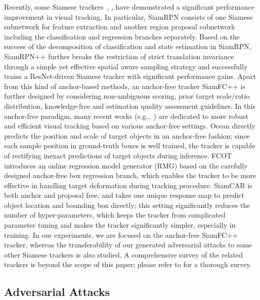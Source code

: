 \documentclass[journal]{IEEEtran}
\newcommand{\eg}{e.g.}
\renewcommand{\uline}{}
\begin{document}
Recently, some Siamese trackers~\cite{SiamFC++}, \cite{zhang2020ocean, cui2020fully, 9157720}, \cite{SiamRPN,SiamRPN++} have demonstrated a significant performance improvement in visual tracking. In particular, SiamRPN \cite{SiamRPN} consists of one Siamese subnetwork for feature extraction and another region proposal subnetwork including the classification and regression branches separately. \uline{Based on the success of the decomposition of classification and state estimation in SiamRPN,} SiamRPN++ \cite{SiamRPN++} further breaks the restriction of strict translation invariance through a simple yet effective spatial aware sampling strategy and successfully trains a ResNet-driven Siamese tracker with significant performance gains. Apart from this kind of anchor-based methods, an anchor-free tracker SiamFC++ \cite{SiamFC++} is further designed by considering non-ambiguous scoring, prior target scale/ratio distribution, knowledge-free and estimation quality assessment guidelines. In this anchor-free paradigm, many recent works (\eg,~\cite{zhang2020ocean, cui2020fully, 9157720}) are dedicated to more robust and efficient visual tracking based on various anchor-free settings. Ocean \cite{zhang2020ocean} directly predicts the position and scale of target objects in an anchor-free fashion; since each sample position in \uline{ground-truth} boxes is well trained, the tracker is capable of rectifying inexact predictions of target objects during inference. FCOT \cite{cui2020fully} introduces an online regression model generator (RMG) based on the carefully designed anchor-free box regression branch, which enables the tracker to be more effective in handling target deformation during tracking procedure. SiamCAR \cite{9157720} is both anchor and proposal free, and takes one unique response map to predict object location and bounding box directly; this setting significantly reduces the number of hyper-parameters, which keeps the tracker from complicated parameter tuning and makes the tracker significantly simpler, especially in training. In our experiments, we are focused on the anchor-free SiamFC++ tracker, whereas the transferability of our generated adversarial attacks to some other Siamese trackers is also studied. A comprehensive survey of the related trackers is beyond the scope of this paper\uline{;} please refer to \cite{9339950} for a thorough survey.
\vspace{-2mm}

\subsection{Adversarial Attacks}
\end{document}
